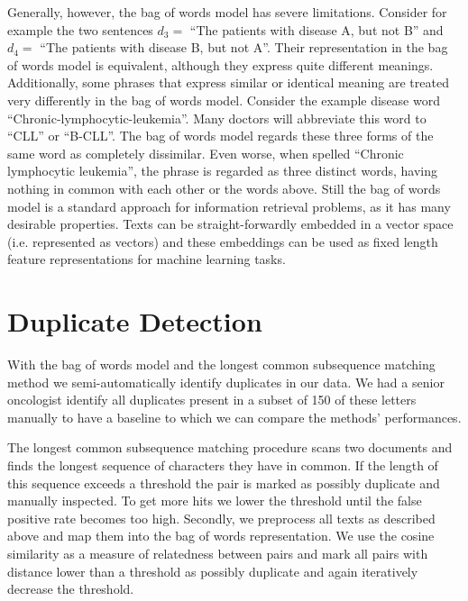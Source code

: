 Generally, however, the bag of words model has severe limitations. Consider for example
the two sentences $d_{3}=$ ``The patients with disease A, but not B'' and $d_{4}=$ ``The patients with disease B, but not A''. Their representation in the bag of words model is equivalent, although they express quite different meanings. Additionally, some phrases that express similar or identical meaning are treated very differently in the bag of words model. Consider the example disease word ``Chronic-lymphocytic-leukemia''. Many doctors will abbreviate this word to ``CLL'' or ``B-CLL''. The bag of words model regards these three forms of the same word as completely dissimilar. Even worse, when spelled ``Chronic lymphocytic leukemia'', the phrase is regarded as three distinct words, having nothing in common with each other or the words above.
Still the bag of words model is a standard approach for information retrieval problems, as
it has many desirable properties. Texts can be straight-forwardly embedded in a vector space (i.e. represented as vectors) and these embeddings can be used as fixed length feature representations for machine learning tasks.



\section{Duplicate Detection}

With the bag of words model and the longest common subsequence matching method we semi-automatically identify duplicates in our data. We had a senior oncologist identify all duplicates present in a subset of 150 of these letters manually to have a baseline to which we can compare the methods' performances.

The longest common subsequence matching procedure scans two documents and finds the longest sequence of characters they have in common. If the length of this sequence exceeds a threshold the pair is marked as possibly duplicate and manually inspected. To get more hits we lower the threshold until the false positive rate becomes too high. Secondly, we preprocess all texts as described above and map them into the bag of words representation. We use the cosine similarity as a measure of relatedness between pairs and mark all pairs with distance lower than a threshold as possibly duplicate and again iteratively decrease the threshold.


